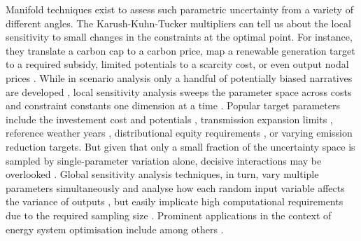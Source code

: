 Manifold techniques exist to assess such parametric uncertainty
from a variety of different angles.
The Karush-Kuhn-Tucker multipliers
can tell us about the local sensitivity to small changes in the constraints at the optimal point.
For instance, they translate a carbon cap to a carbon price, map a renewable generation target to a required subsidy, limited potentials to a scarcity cost, or even output nodal prices \cite{marketvalue}.
While in scenario analysis only
a handful of potentially biased narratives are developed \cite{DeCarolis2017,soroudi_decision_2013,usher_value_2015}, local sensitivity analysis sweeps the parameter space
across costs and constraint constants one dimension at a time \cite{schlachtberger_cost_2018}.
Popular target parameters include the investement cost and potentials \cite{schlachtberger_cost_2018},
transmission expansion limits \cite{schlachtberger_benefits_2017},
reference weather years \cite{bloomfield_2021},
distributional equity requirements \cite{sasse_regional_2020,sasse_distributional_2019},
or varying emission reduction targets.
But given that only a small fraction of the uncertainty space
is sampled by single-parameter variation alone,
decisive interactions may be overlooked \cite{pizarro-alonso_uncertainties_2019}.
Global sensitivity analysis techniques, in turn, vary multiple parameters simultaneously
and analyse how each random input variable affects the variance of outputs \cite{sudret_global_2008},
but easily implicate high computational requirements due to the required sampling size \cite{usher_value_2015,pizarro-alonso_uncertainties_2019,moret_robust_2016}.
Prominent applications in the context of energy system optimisation include among others
\cite{trondle_trade-offs_2020,fais_impact_2016,mavromatidis_uncertainty_2018,pilpola_analyzing_2020}.

